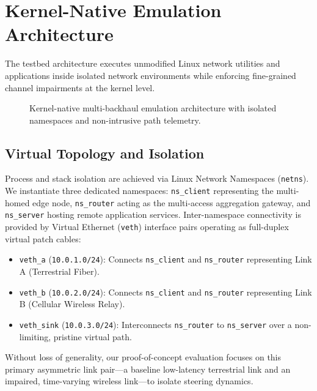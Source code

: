 \documentclass[conference]{IEEEtran}
\begin{document}
\section{Kernel-Native Emulation Architecture}

The testbed architecture executes unmodified Linux network utilities and applications inside isolated network environments while enforcing fine-grained channel impairments at the kernel level.

\begin{figure}[htbp]
\centering
{}
\caption{Kernel-native multi-backhaul emulation architecture with isolated namespaces and non-intrusive path telemetry.}
\label{fig:architecture}
\end{figure}

\subsection{Virtual Topology and Isolation}
Process and stack isolation are achieved via Linux Network Namespaces (\texttt{netns}). We instantiate three dedicated namespaces: \texttt{ns\_client} representing the multi-homed edge node, \texttt{ns\_router} acting as the multi-access aggregation gateway, and \texttt{ns\_server} hosting remote application services. Inter-namespace connectivity is provided by Virtual Ethernet (\texttt{veth}) interface pairs operating as full-duplex virtual patch cables:
\begin{itemize}
    \item \texttt{veth\_a} (\texttt{10.0.1.0/24}): Connects \texttt{ns\_client} and \texttt{ns\_router} representing Link A (Terrestrial Fiber).
    \item \texttt{veth\_b} (\texttt{10.0.2.0/24}): Connects \texttt{ns\_client} and \texttt{ns\_router} representing Link B (Cellular Wireless Relay).
    \item \texttt{veth\_sink} (\texttt{10.0.3.0/24}): Interconnects \texttt{ns\_router} to \texttt{ns\_server} over a non-limiting, pristine virtual path.
\end{itemize}
Without loss of generality, our proof-of-concept evaluation focuses on this primary asymmetric link pair---a baseline low-latency terrestrial link and an impaired, time-varying wireless link---to isolate steering dynamics.
\end{document}
